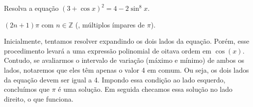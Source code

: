 \begin{question}
    Resolva a equação $\left(3 + \cos x\right)^2 = 4 - 2 \sin^8 x$.

    \begin{answer}
        $(2n+1)\pi$ com $n \in \mathbb{Z}$ (\ie, múltiplos ímpares de $\pi$).
    \end{answer}

    \begin{solution}
        Inicialmente, tentamos resolver expandindo os dois lados da equação.
        Porém, esse procedimento levará a uma expressão polinomial de oitava ordem em $\cos(x)$.
        Contudo, se avaliarmos o intervalo de variação (máximo e mínimo) de ambos os lados, notaremos que eles têm apenas o valor 4 em comum.
        Ou seja, os dois lados da equação devem ser igual a 4.
        Impondo essa condição ao lado esquerdo, concluímos que $\pi$ é uma solução.
        Em seguida checamos essa solução no lado direito, o que funciona.
    \end{solution}
\end{question}
